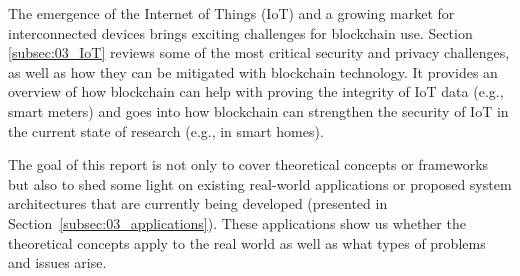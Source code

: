 The emergence of the Internet of Things (IoT) and a growing market for interconnected devices brings exciting challenges for blockchain use. Section \ref{subsec:03_IoT} reviews some of the most critical security and privacy challenges, as well as how they can be mitigated with blockchain technology. It provides an overview of how blockchain can help with proving the integrity of IoT data (e.g., smart meters) and goes into how blockchain can strengthen the security of IoT in the current state of research (e.g., in smart homes).

The goal of this report is not only to cover theoretical concepts or frameworks but also to shed some light on existing real-world applications or proposed system architectures that are currently being developed (presented in Section~\ref{subsec:03_applications}). These applications show us whether the theoretical concepts apply to the real world as well as what types of problems and issues arise.
